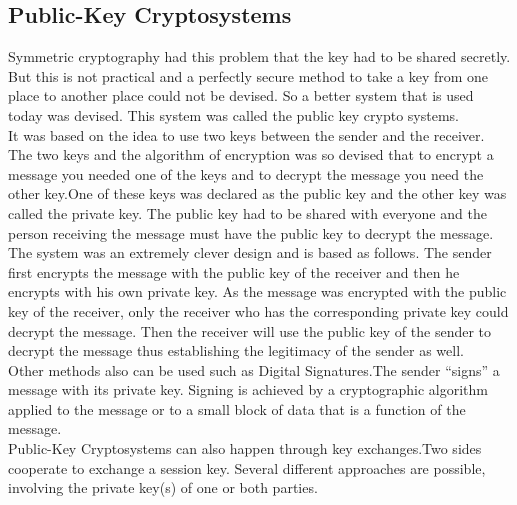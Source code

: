 \documentclass{article}
\begin{document}
\subsection{Public-Key Cryptosystems}
Symmetric cryptography had this problem that the key had to be shared secretly. But this is not practical and a perfectly secure method to take a key from one place to another place could not be devised. So a better system that is used today was devised. This system was called the public key crypto systems.\\
It was based on the idea to use two keys between the sender and the receiver. The two keys and the algorithm of encryption was so devised that to encrypt a message you needed one of the keys and to decrypt the message you need the other key.One of these keys was declared as the public key and the other key was called the private key. The public key had to be shared with everyone and the person receiving the message must have the public key to decrypt the message. \\
The system was an extremely clever design and is based as follows. The sender first encrypts the message with the public key of the receiver and then he encrypts with his own private key. As the message was encrypted with the public key of the receiver, only the receiver who has the corresponding private key could decrypt the message. Then the receiver will use the public key of the sender to decrypt the message thus establishing the legitimacy of the sender as well.\\
Other methods also can be used such as Digital Signatures.The sender “signs” a message with its private key. Signing is achieved by a cryptographic algorithm applied to the message or to a small block of data that is a function of the message.\\
Public-Key Cryptosystems can also happen through key exchanges.Two sides cooperate to exchange a session key. Several different approaches are possible, involving the private key(s) of one or both parties.
\end{document}
